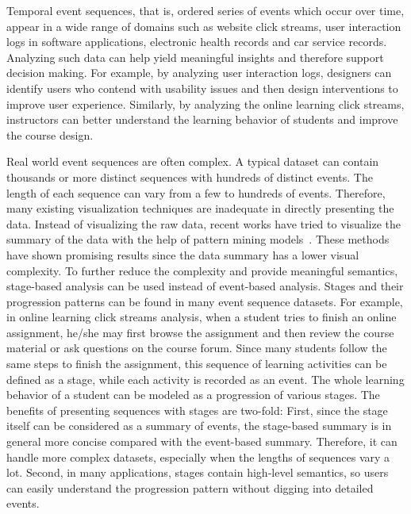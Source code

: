 
Temporal event sequences, that is, ordered series of events which occur over time, appear in a wide range of domains such as website click streams, user interaction logs in software applications, electronic health records and car service records. Analyzing such data can help yield meaningful insights and therefore support decision making. For example, by analyzing user interaction logs, designers can identify users who contend with usability issues and then design interventions to improve user experience. Similarly, by analyzing the online learning click streams, instructors can better understand the learning behavior of students and improve the course design.  

Real world event sequences are often complex. A typical dataset can contain thousands or more distinct sequences with hundreds of distinct events. The length of each sequence can vary from a few to hundreds of events. Therefore, many existing visualization techniques are inadequate in directly presenting the data. Instead of visualizing the raw data, recent works have tried to visualize the summary of the data with the help of pattern mining models~\cite{stasko2000focus+,polack2015timestitch,perer2014frequence,kwon2016peekquence,liu2017patterns,wang2016unsupervised,liu2017coreflow,guo2018eventthread}. These methods have shown promising results since the data summary has a lower visual complexity. To further reduce the complexity and provide meaningful semantics, stage-based analysis can be used instead of event-based analysis. Stages and their progression patterns can be found in many event sequence datasets. For example, in online learning click streams analysis, when a student tries to finish an online assignment, he/she may first browse the assignment and then review the course material or ask questions on the course forum. Since many students follow the same steps to finish the assignment, this sequence of learning activities can be defined as a stage, while each activity is recorded as an event. The whole learning behavior of a student can be modeled as a progression of various stages. The benefits of presenting sequences with stages are two-fold: First, since the stage itself can be considered as a summary of events, the stage-based summary is in general more concise compared with the event-based summary. Therefore, it can handle more complex datasets, especially when the lengths of sequences vary a lot. Second, in many applications, stages contain high-level semantics, so users can easily understand the progression pattern without digging into detailed events.  

